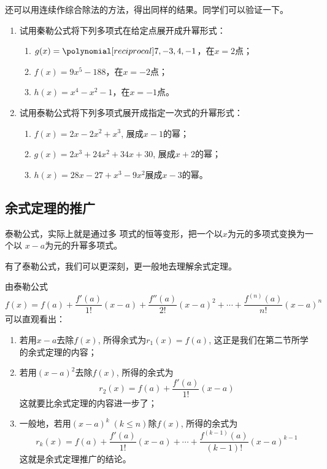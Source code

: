     还可以用连续作综合除法的方法，得出同样的结果。同学们可以验证一下。

\begin{ex}
\begin{enumerate}
    \item 试用秦勒公式将下列多项式在给定点展开成升幂形式：
\begin{enumerate}
    \item $g(x)=\poly{7,-3,4,-1}$，在$x=2$点；
    \item $f (x) =9x^5-188$，在$x=-2$点；
    \item $h(x)=x^4-x^2-1$，在$x=-1$点。
\end{enumerate}

    \item 试用泰勒公式将下列多项式展开成指定一次式的升幂形式：
\begin{enumerate}
    \item $f(x)=2x-2x^2+x^3$, 展成$x-1$的幂；
    \item $g(x)=2x^3+24x^2+34x+30$, 展成$x+2$的幂；
    \item $h(x)=28x-27+x^3-9x^2$展成$x-3$的幂。
\end{enumerate} 
\end{enumerate}
\end{ex}
    
\subsection{余式定理的推广}

泰勒公式，实际上就是通过多
项式的恒等变形，把一个以$x$为元的多项式变换为一个以
$x-a$为元的升幂多项式。

有了泰勒公式，我们可以更深刻，更一般地去理解余式定理。

由泰勒公式
\[f(x)=f(a)+\frac{f'(a)}{1!}(x-a)+\frac{f''(a)}{2!}(x-a)^2+\cdots+\frac{f^{(n)}(a)}{n!}(x-a)^n\]
可以直观看出：
\begin{enumerate}
    \item 若用$x-a$去除$f(x)$, 所得余式为$r_1(x)=f(a)$, 这正是我们在第二节所学的余式定理的内容；
    \item 若用$(x-a)^2$去除$f(x)$, 所得的余式为
    \[ r_2(x) =f (a) +\frac{f'(a)}{1!}  (x-a)\]
    这就要比余式定理的内容进一步了；
    \item 一般地，若用$(x-a)^k\; (k\le n)$除$f(x)$, 所得的余式为
    \[r_k(x)=f(a)+\frac{f'(a)}{1!}(x-a)+\cdots+\frac{f^{(k-1)}(a)}{(k-1)!}(x-a)^{k-1}\]
    这就是余式定理推广的结论。
\end{enumerate}

